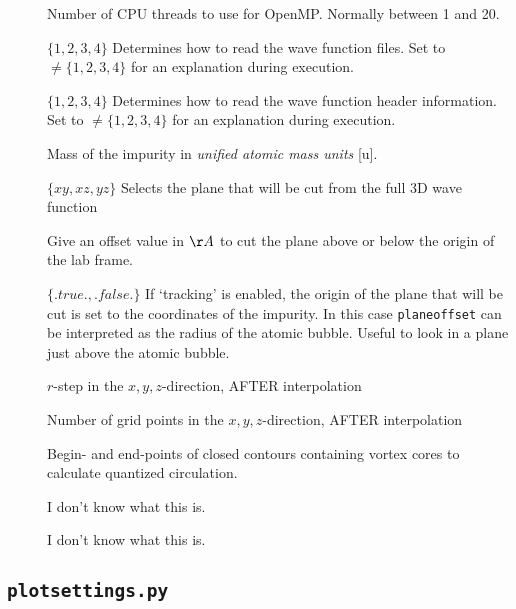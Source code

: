 \documentclass[10pt,a4paper]{article}
\begin{document}
\begin{description}
 \item[] Number of CPU threads to use for OpenMP. Normally between 1 and 20.
 \item[] $\{1,2,3,4\}$ Determines how to read the wave function files. Set to $\neq \{1,2,3,4\}$ for an explanation during execution.
 \item[] $\{1,2,3,4\}$ Determines how to read the wave function header information. Set to $\neq \{1,2,3,4\}$ for an explanation during execution.
 \item[] Mass of the impurity in \emph{unified atomic mass units} [u].
 \item[] $\{xy,xz,yz\}$ Selects the plane that will be cut from the full 3D wave function
 \item[] Give an offset value in $\AA$ to cut the plane above or below the origin of the lab frame.
 \item[] $\{.true., .false.\}$ If `tracking' is enabled, the origin of the plane that will be cut is set to the coordinates of the impurity. In this case \verb+planeoffset+ can be interpreted as the radius of the atomic bubble. Useful to look in a plane just above the atomic bubble.
 \item[] $r$-step in the $x,y,z$-direction, AFTER interpolation
 \item[] Number of grid points in the $x,y,z$-direction, AFTER interpolation
 \item[] Begin- and end-points of closed contours containing vortex cores to calculate quantized circulation.
 \item[] I don't know what this is.
 \item[] I don't know what this is.
\end{description}

\subsection{\protect\Verb+plotsettings.py+}
\end{document}
